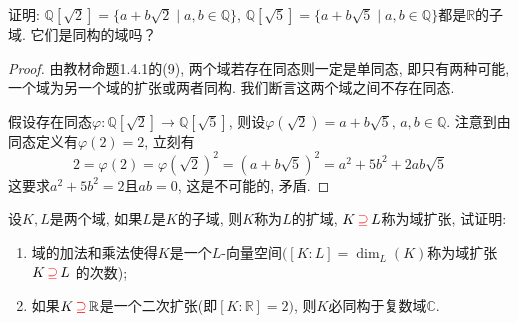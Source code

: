 \begin{problem}\label{ex:1.4.8}
    证明: $\mathbb{Q}[\sqrt 2] = \{a + b\sqrt 2 \mid a, b \in \mathbb{Q}\}$, $\mathbb{Q}[\sqrt 5] = \{a + b\sqrt 5 \mid a, b \in \mathbb{Q}\}$都是$\mathbb{R}$的子域. 它们是同构的域吗？
\end{problem}

\begin{proof}
    由教材命题1.4.1的(9), 两个域若存在同态则一定是单同态, 即只有两种可能, 一个域为另一个域的扩张或两者同构. 我们断言这两个域之间不存在同态.
    
    假设存在同态$\varphi: \mathbb{Q}[\sqrt{2}] \to \mathbb{Q}[\sqrt{5}]$, 则设$\varphi(\sqrt{2}) = a + b\sqrt{5},\, a, b \in \mathbb{Q}$. 注意到由同态定义有$\varphi(2) = 2$, 立刻有
    \[
        2 = \varphi(2) = \varphi(\sqrt{2})^2 = (a + b\sqrt{5})^2 = a^2 + 5b^2 + 2ab\sqrt{5}
    \]
    这要求$a^2 + 5b^2 = 2$且$ab = 0$, 这是不可能的, 矛盾.
\end{proof}

\begin{problem}\label{ex:1.4.9}
    设$K, L$是两个域, 如果$L$是$K$的子域, 则$K$称为$L$的扩域, $K \,\textcolor{red}{\supseteq}\, L$称为域扩张, 试证明:
    \begin{enumerate}[(1)]
        \item 域的加法和乘法使得$K$是一个$L$-向量空间$([K:L] = \dim_L(K)$称为域扩张$K \,\textcolor{red}{\supseteq}\, L$ 的次数);
        \item 如果$K \,\textcolor{red}{\supseteq}\, \mathbb{R}$是一个二次扩张(即$[K:\mathbb{R}] = 2)$, 则$K$必同构于复数域$\mathbb{C}$.
    \end{enumerate}
\end{problem}

